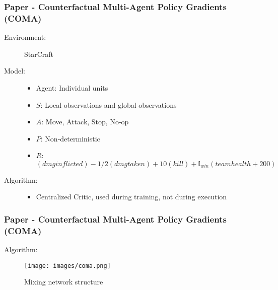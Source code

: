 \documentclass{beamer}
\begin{document}
\begin{frame} %
    \frametitle{Paper \thepapercounter - Counterfactual Multi-Agent Policy Gradients (COMA)
    }
    \begin{description}
        \item[Environment:] StarCraft
        \item[] \item[Model:]
        \begin{itemize}
            \item Agent: Individual units
            \item $S$: Local observations and global observations
            \item $A$: Move, Attack, Stop, No-op
            \item $P$: Non-deterministic
            \item $R$: $(dmg inflicted) - 1/2(dmg taken) + 10(kill) 
            + \mathbb{I}_{win}(team health + 200)$
        \end{itemize}
        \item[Algorithm:] 
        \begin{itemize}
            \item Centralized Critic, used during training, not during execution
        \end{itemize}
    \end{description}
\end{frame}

\begin{frame} %
    \frametitle{Paper \thepapercounter - Counterfactual Multi-Agent Policy Gradients (COMA)
    \cite{foerster2018}}
    \begin{description}
        \item[Algorithm:] 
    \end{description}
    \begin{figure}\small
        \texttt{[image: images/coma.png]}
        \caption{Mixing network structure\cite{foerster2018}}
    \end{figure}
\end{frame}
\end{document}
